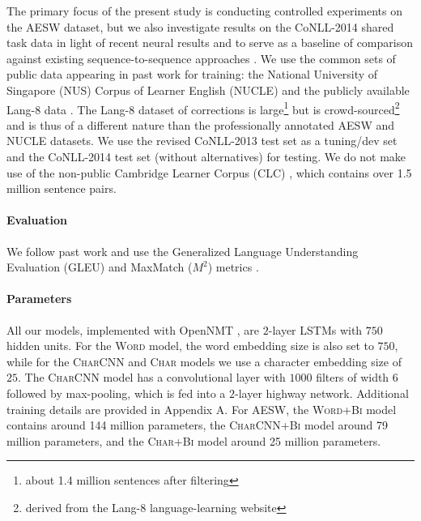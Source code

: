 \documentclass[11pt,letterpaper]{article}
\begin{document}
The primary focus of the present study is conducting controlled experiments on the AESW dataset, but we also investigate results on the CoNLL-2014 shared task data in light of recent neural results \cite{JiEtal2017arXiv-NestedAttention} and to serve as a baseline of comparison against existing sequence-to-sequence approaches \cite{yuan-briscoe:2016:N16-1,XieEtAl.2016-arxiv-NLCwithCharAttention}. We use the common sets of public data appearing in past work for training: the National University of Singapore (NUS) Corpus of Learner English (NUCLE) \cite{dahlmeier-ng-wu:2013:BEA8} and the publicly available Lang-8 data \cite{tajiri-komachi-matsumoto:2012:ACL2012short,mizumoto-EtAl:2012:POSTERS}. The Lang-8 dataset of corrections is large\footnote{about 1.4 million sentences after filtering} but is crowd-sourced\footnote{derived from the Lang-8 language-learning website} and is thus of a different nature than the professionally annotated AESW and NUCLE datasets. We use the revised CoNLL-2013 test set as a tuning/dev set and the CoNLL-2014 test set (without alternatives) for testing. We do not make use of the non-public Cambridge Learner Corpus (CLC) \cite{Nicholls2003-CLC}, which contains over 1.5 million sentence pairs. 

\paragraph{Evaluation} We follow past work and use the Generalized Language Understanding Evaluation (GLEU) \cite{napoles2016gleu} and MaxMatch ($M^2$) metrics \cite{DahlmeierEtAl2012-M2}.

\paragraph{Parameters}
All our models, implemented with OpenNMT \cite{2017opennmt}, are $2$-layer LSTMs with $750$ hidden units. For the \textsc{Word} model,
the word embedding size is also set to $750$, while for the \textsc{CharCNN} and \textsc{Char} models
we use a character embedding size of $25$. The \textsc{CharCNN} model has a convolutional
layer with $1000$ filters of width $6$ followed by max-pooling, which is fed into a $2$-layer highway network. Additional training details are provided in Appendix A. For AESW, the \textsc{Word+Bi} model contains around 144 million parameters, the \textsc{CharCNN+Bi} model around 79 million parameters, and the \textsc{Char+Bi} model around 25 million parameters.
\end{document}
